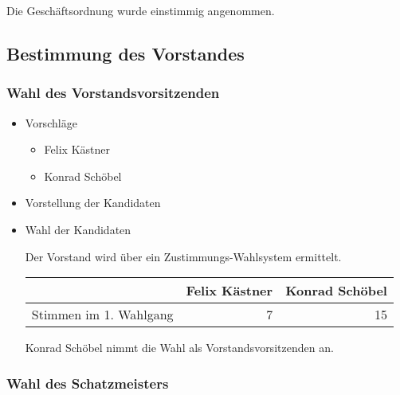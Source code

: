 \documentclass[11pt]{article}
\begin{document}
Die Geschäftsordnung wurde einstimmig angenommen.
\subsection{Bestimmung des Vorstandes}
\label{sec-1.7}

\subsubsection{Wahl des Vorstandsvorsitzenden}
\label{sec-1.7.1}

\begin{itemize}

\item Vorschläge\\
\label{sec-1.7.1.1}

\begin{itemize}
\item Felix Kästner
\item Konrad Schöbel
\end{itemize}

\item Vorstellung der Kandidaten\\
\label{sec-1.7.1.2}


\item Wahl der Kandidaten\\
\label{sec-1.7.1.3}

Der Vorstand wird über ein Zustimmungs-Wahlsystem ermittelt.


\begin{center}
\begin{tabular}{lrr}
\hline
                         &  Felix Kästner  &  Konrad Schöbel  \\
\hline
 Stimmen im 1. Wahlgang  &              7  &              15  \\
\hline
\end{tabular}
\end{center}



Konrad Schöbel nimmt die Wahl als Vorstandsvorsitzenden an.

\end{itemize} %
\subsubsection{Wahl des Schatzmeisters}
\label{sec-1.7.2}
\end{document}
